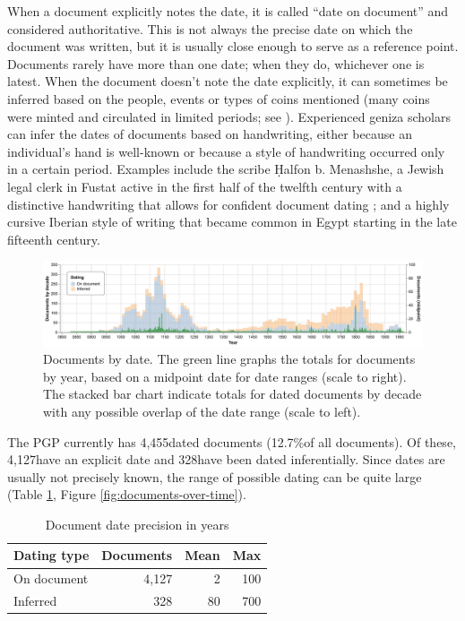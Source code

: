 \documentclass{article}
\def\totalDatedDocs{4,455}
\def\percentDatedDocs{12.7\%}
\def\totalDateOnDoc{4,127}
\def\totalInferredDate{328}
\begin{document}
When a document explicitly notes the date, it is called “date on document” and considered authoritative. This is not always the precise date on which the document was written, but it is usually close enough to serve as a reference point. Documents rarely have more than one date; when they do,  whichever one is latest. When the document doesn’t note the date explicitly, it can sometimes be inferred based on the people, events or types of coins mentioned (many coins were minted and circulated in limited periods; see \cite{dudley_coins_2023}). Experienced geniza scholars can infer the dates of documents based on handwriting, either because an individual’s hand is well-known or because a style of handwriting occurred only in a certain period. Examples include the scribe Ḥalfon b. Menashshe, a Jewish legal clerk in Fustat active in the first half of the twelfth century with a distinctive handwriting that allows for confident document dating \autocite{elbaum_halfon_nodate}; and a highly cursive Iberian style of writing that became common in Egypt starting in the late fifteenth century.

\begin{figure}[!hbt]
  \centering
  \includegraphics[width=\textwidth]{charts/combined_dating.pdf}
  \caption{Documents by date. The green line graphs the totals for documents by year, based on a midpoint date for date ranges (scale to right). The stacked bar chart indicate totals for dated documents by decade with any possible overlap of the date range (scale to left).}
  \label{fig:docs_dating_combined}
\end{figure}


The PGP currently has \totalDatedDocs\space dated documents (\percentDatedDocs\space of all documents). Of these, \totalDateOnDoc\space have an explicit date and \totalInferredDate\space have been dated inferentially. Since dates are usually not precisely known, the range of possible dating can be quite large (Table \ref{table:date-precision}, Figure \ref{fig:documents-over-time}).

\begin{table}
\begin{center}
\caption{Document date precision in years}
\label{table:date-precision}
\begin{tabular}{lrrr}
\toprule
Dating type & Documents & Mean & Max \\
\midrule
On document & 4,127 & 2 & 100 \\
Inferred & 328 & 80 & 700 \\
\bottomrule
\end{tabular}
\end{center}
\end{table}
\end{document}
